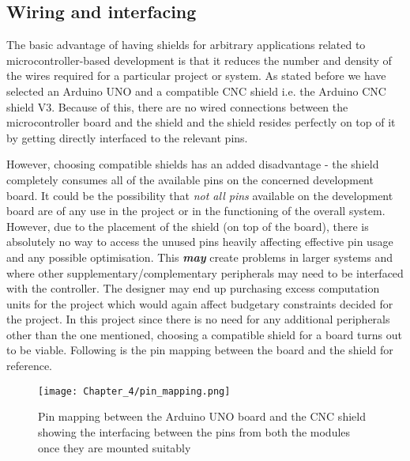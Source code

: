 \subsection{Wiring and interfacing} \label{winterface}

The basic advantage of having shields for arbitrary applications related to microcontroller-based development is that it reduces the number and density of the wires required for a particular project or system. As stated before we have selected an Arduino UNO and a compatible CNC shield i.e. the Arduino CNC shield V3. Because of this, there are no wired connections between the microcontroller board and the shield and the shield resides perfectly on top of it by getting directly interfaced to the relevant pins. \par

However, choosing compatible shields has an added disadvantage - the shield completely consumes all of the available pins on the concerned development board. It could be the possibility that \textit{not all pins} available on the development board are of any use in the project or in the functioning of the overall system. However, due to the placement of the shield (on top of the board), there is absolutely no way to access the unused pins heavily affecting effective pin usage and any possible optimisation. This \textbf{\textit{may}} create problems in larger systems and where other supplementary/complementary peripherals may need to be interfaced with the controller. The designer may end up purchasing excess computation units for the project which would again affect budgetary constraints decided for the project.  In this project since there is no need for any additional peripherals other than the one mentioned, choosing a compatible shield for a board turns out to be viable. Following is the pin mapping between the board and the shield for reference. \cite{online_interface_guide} \par

\begin{figure}[h]
 \centering
 \texttt{[image: Chapter\_4/pin\_mapping.png]}
 \caption{Pin mapping between the Arduino UNO board and the CNC shield showing the interfacing between the pins from both the modules once they are mounted suitably}
 \label{fig:pin_map}
\end{figure} 


